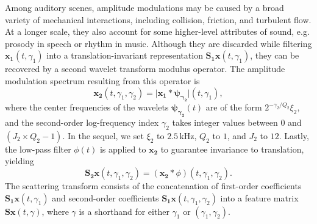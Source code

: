 \documentclass[journal]{IEEEtran}
\makeatletter
\newcommand*{\eg}{e.g.\@\xspace}
\makeatother
\begin{document}
Among auditory scenes, amplitude modulations may be caused by a broad variety of mechanical interactions, including collision, friction, and turbulent flow.
At a longer scale, they also account for some higher-level attributes of sound, \eg prosody in speech or rhythm in music.
Although they are discarded while filtering $\boldsymbol{x_1}(t,\gamma_1)$ into a translation-invariant representation $\mathbf{S_1}\boldsymbol{x}(t,\gamma_1)$, they can be recovered by a second wavelet transform modulus operator.
The amplitude modulation spectrum resulting from this operator is
\begin{equation}
\boldsymbol{x_2}(t,\gamma_1,\gamma_2) =
\vert \boldsymbol{x_1} \ast \boldsymbol{\psi_{\gamma_2}} \vert(t,\gamma_1),
\end{equation}
where the center frequencies of the wavelets $\boldsymbol{\psi_{\gamma_2}}(t)$ are of the form $2^{-\gamma_2/Q_2} \xi_2$, and the second-order log-frequency index $\gamma_2$ takes integer values between $0$ and $(J_2 \times Q_2 - 1)$.
In the sequel, we set $\xi_2$ to $2.5\,\mathrm{kHz}$, $Q_2$ to $1$, and $J_2$ to $12$. Lastly, the low-pass filter $\phi(t)$ is applied to $\boldsymbol{x_2}$ to guarantee invariance to translation, yielding
\begin{equation}
\mathbf{S_2}\boldsymbol{x}(t,\gamma_1,\gamma_2) =
(\boldsymbol{x_2} \ast \phi)(t,\gamma_1,\gamma_2).
\end{equation}
The scattering transform consists of the concatenation of first-order coefficients $\mathbf{S_1}\boldsymbol{x}(t,\gamma_1)$ and second-order coefficients $\mathbf{S_1}\boldsymbol{x}(t,\gamma_1,\gamma_2)$ into a feature matrix $\mathbf{S}\boldsymbol{x}(t,\gamma)$, where $\gamma$ is a shorthand for either $\gamma_1$ or $(\gamma_1,\gamma_2)$.
\end{document}
